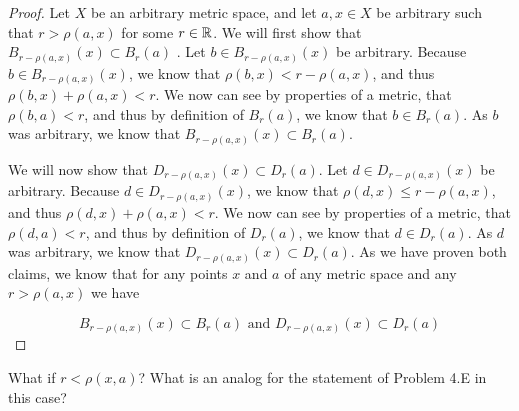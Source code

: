 \begin{proof}
  Let $X$ be an arbitrary metric space, and let $a,x\in X$ be
  arbitrary such that $r
  > \rho(a,x)$ for some $r\in \mathbb{R}$.  We will first show that 
  $B_{r-\rho(a,x)}(x) \subset B_r(a)$ . Let $b \in B_{r-\rho(a,x)}(x)$
  be arbitrary. Because $b \in B_{r-\rho(a,x)}(x)$, we know that
  $\rho(b,x) < r- \rho(a,x)$, and thus   $\rho(b,x) + \rho(a,x)<
  r$. We now can see by properties of a metric, that $\rho(b,a)<r$,
  and thus by definition of $B_r(a)$, we know that $b \in B_r(a)$. As
  $b$ was arbitrary, we know that $B_{r-\rho(a,x)}(x) \subset B_r(a)$.

  We will now show that $D_{r-\rho(a,x)}(x) \subset D_r(a)$. Let $d 
  \in D_{r-\rho(a,x)}(x)$ be arbitrary. Because $d \in D_{r-\rho(a,x)}(x)$, we know that
  $\rho(d,x) \leq r- \rho(a,x)$, and thus   $\rho(d,x) + \rho(a,x)<
  r$. We now can see by properties of a metric, that $\rho(d,a)<r$,
  and thus by definition of $D_r(a)$, we know that $d \in D_r(a)$. As
  $d$ was arbitrary, we know that $D_{r-\rho(a,x)}(x) \subset
  D_r(a)$. As we have proven both claims, we know that for any points
  $x$ and $a$ of any metric space and any $r 
  > \rho(a,x)$ we have

  $$B_{r-\rho(a,x)}(x) \subset B_r(a) \text{  and  }
  D_{r-\rho(a,x)}(x) \subset D_r(a)$$
\end{proof}

\begin{minorEx}
    What if $r < \rho(x,a)$? What is an analog for the statement of Problem 4.E
    in this case?
\end{minorEx}
